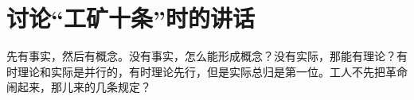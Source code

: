 \section[讨论“工矿十条”时的讲话（一九六六年十二月六日）]{讨论“工矿十条”时的讲话}


先有事实，然后有概念。没有事实，怎么能形成概念？没有实际，那能有理论？有时理论和实际是并行的，有时理论先行，但是实际总归是第一位。工人不先把革命闹起来，那儿来的几条规定？


